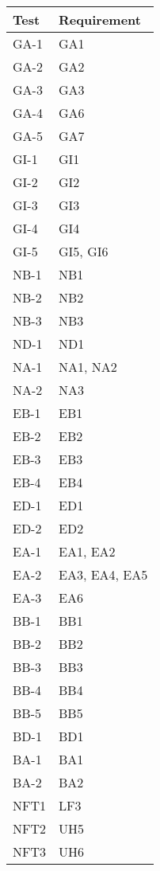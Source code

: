 \documentclass[12pt, titlepage]{article}
\begin{document}
\begin{longtable}{| p{} | p{} |}
    \hline
    Test & Requirement\\
    \hline
    GA-1 & GA1\\
    \hline
    GA-2 & GA2\\
    \hline
    GA-3 & GA3\\
    \hline
    GA-4 & GA6\\
    \hline
    GA-5 & GA7\\
    \hline
    GI-1 & GI1\\
    \hline
    GI-2 & GI2\\
    \hline
    GI-3 & GI3\\
    \hline
    GI-4 & GI4\\
    \hline
    GI-5 & GI5, GI6\\
    \hline
    NB-1 & NB1\\
    \hline
    NB-2 & NB2\\
    \hline
    NB-3 & NB3\\
    \hline
    ND-1 & ND1\\
    \hline
    NA-1 & NA1, NA2\\
    \hline
    NA-2 & NA3\\
    \hline
    EB-1 & EB1\\
    \hline
    EB-2 & EB2\\
    \hline
    EB-3 & EB3\\
    \hline
    EB-4 & EB4\\
    \hline
    ED-1 & ED1\\
    \hline
    ED-2 & ED2\\
    \hline
    EA-1 & EA1, EA2\\
    \hline
    EA-2 & EA3, EA4, EA5\\
    \hline
    EA-3 & EA6\\
    \hline
    BB-1 & BB1\\
    \hline
    BB-2 & BB2\\
    \hline
    BB-3 & BB3\\
    \hline
    BB-4 & BB4\\
    \hline
    BB-5 & BB5\\
    \hline
    BD-1 & BD1\\
    \hline
    BA-1 & BA1\\
    \hline
    BA-2 & BA2\\
    \hline
    NFT1 & LF3\\
    \hline
    NFT2 & UH5\\
    \hline
    NFT3 & UH6\\

\end{longtable}
\end{document}
